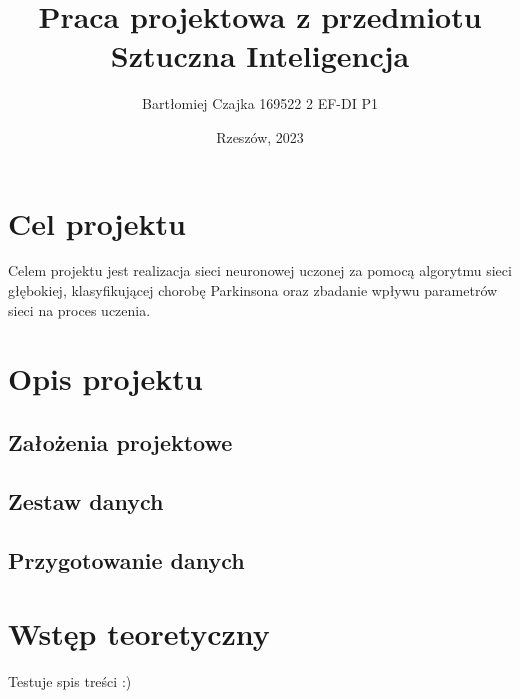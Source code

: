 \documentclass{article}
\title{\textbf{Praca projektowa z przedmiotu Sztuczna Inteligencja}}
\author{Bartłomiej Czajka 169522 2 EF-DI P1}
\date{Rzeszów, 2023}
\begin{document}
\maketitle
\pagebreak

\section*{Cel projektu}
Celem projektu jest realizacja sieci neuronowej uczonej za pomocą algorytmu sieci głębokiej, klasyfikującej chorobę Parkinsona oraz zbadanie wpływu parametrów sieci na proces uczenia.
\tableofcontents{}
\section{Opis projektu}
\subsection{Założenia projektowe}

\subsection{Zestaw danych}

\subsection{Przygotowanie danych}

\section{Wstęp teoretyczny}
Testuje spis treści :)
\end{document}
